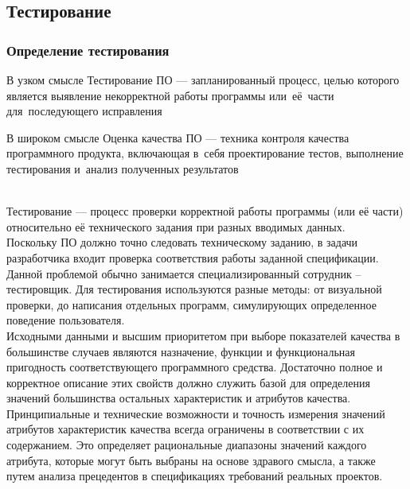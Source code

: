 \documentclass{../industrial-development}
\begin{document}
\subsection{Тестирование}
\begin{frame} \frametitle{Определение тестирования}
	\begin{minipage}{0.46\textwidth}
		\begin{block}{В узком смысле}
			Тестирование ПО --- запланированный процесс, целью которого является выявление некорректной работы программы или~её~части для~последующего исправления
		\end{block}
	\end{minipage}
	\hfill
	\begin{minipage}{0.5\textwidth}
		\begin{block}{В широком смысле}
			Оценка качества ПО --- техника контроля качества программного продукта, включающая в~себя проектирование тестов, выполнение тестирования и~анализ полученных результатов
		\end{block}
	\end{minipage}
\end{frame}
\lecturenotes
\\Тестирование --- процесс проверки корректной работы программы (или её части) относительно её технического задания при разных вводимых данных.\\
Поскольку ПО должно точно следовать техническому заданию, в задачи разработчика входит проверка соответствия работы заданной спецификации. Данной проблемой обычно занимается специализированный сотрудник – тестировщик. Для тестирования используются разные методы: от визуальной проверки, до написания отдельных программ, симулирующих определенное поведение пользователя.\\
Исходными данными и высшим приоритетом при выборе показателей качества в большинстве случаев являются назначение, функции и функциональная пригодность соответствующего программного средства. Достаточно полное и корректное описание этих свойств должно служить базой для определения значений большинства остальных характеристик и атрибутов качества. Принципиальные и технические возможности и точность измерения значений атрибутов характеристик качества всегда ограничены в соответствии с их содержанием. Это определяет рациональные диапазоны значений каждого атрибута, которые могут быть выбраны на основе здравого смысла, а также путем анализа прецедентов в спецификациях требований реальных проектов.
\end{document}
